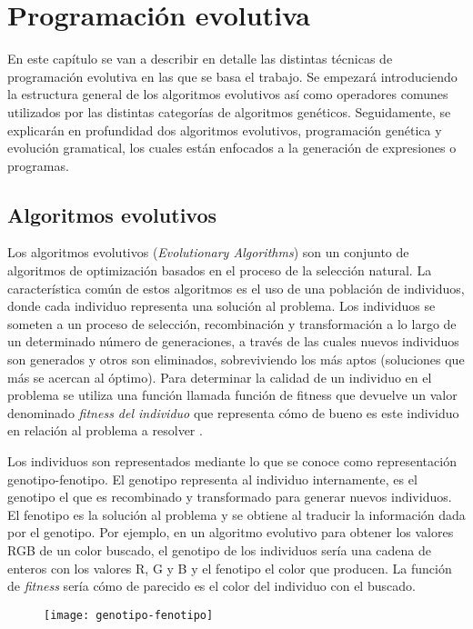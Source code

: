 \chapter{Programación evolutiva} \label{cap:prog_evol}
En este capítulo se van a describir en detalle las distintas técnicas de programación evolutiva en las que se basa el trabajo. Se empezará introduciendo la estructura general de los algoritmos evolutivos así como operadores comunes utilizados por las distintas categorías de algoritmos genéticos. Seguidamente, se explicarán en profundidad dos algoritmos evolutivos, programación genética y evolución gramatical, los cuales están enfocados a la generación de expresiones o programas.

\section{Algoritmos evolutivos}
Los algoritmos evolutivos (\textit{Evolutionary Algorithms}) son un conjunto de algoritmos de optimización basados en el proceso de la selección natural. La característica común de estos algoritmos es el uso de una población de individuos, donde cada individuo representa una solución al problema. Los individuos se someten a un proceso de selección, recombinación y transformación a lo largo de un determinado número de generaciones, a través de las cuales nuevos individuos son generados y otros son eliminados, sobreviviendo los más aptos (soluciones que más se acercan al óptimo). Para determinar la calidad de un individuo en el problema se utiliza una función llamada función de fitness que devuelve un valor denominado \textit{fitness del individuo} que representa cómo de bueno es este individuo en relación al problema a resolver \cite{cervigon09}.

Los individuos son representados mediante lo que se conoce como representación genotipo-fenotipo. El genotipo representa al individuo internamente, es el genotipo el que es recombinado y transformado para generar nuevos individuos. El fenotipo es la solución al problema y se obtiene al traducir la información dada por el genotipo. Por ejemplo, en un algoritmo evolutivo para obtener los valores RGB de un color buscado, el genotipo de los individuos sería una cadena de enteros con los valores R, G y B y el fenotipo el color que producen. La función de \textit{fitness} sería cómo de parecido es el color del individuo con el buscado.
\begin{figure}[H]
\centering
\texttt{[image: genotipo-fenotipo]}
\end{figure}

